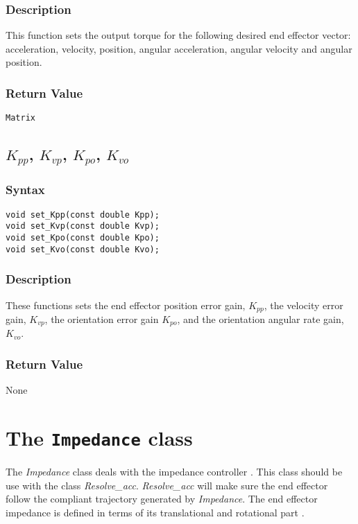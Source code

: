 \documentclass[dvips,11pt,fleqn]{report}
\begin{document}
\subsubsection*{Description}   
This function sets the output torque for the following desired end
effector vector: acceleration, velocity, position, angular
acceleration, angular velocity and angular position.
\subsubsection*{Return Value}

\texttt{Matrix}

\newpage

\subsection*{$K_{pp}$, $K_{vp}$, $K_{po}$, $K_{vo}$}
\subsubsection*{Syntax}
\begin{verbatim}
void set_Kpp(const double Kpp);
void set_Kvp(const double Kvp);
void set_Kpo(const double Kpo);
void set_Kvo(const double Kvo);
\end{verbatim}

\subsubsection*{Description}   
These functions sets the end effector position error gain, $K_{pp}$, the velocity
error gain, $K_{vp}$, the orientation error gain $K_{po}$, and the
orientation angular rate gain, $K_{vo}$.
\subsubsection*{Return Value}

None


\newpage

\section{The \texttt{Impedance} class}

The \emph{Impedance} class deals with the impedance controller
\cite{Caccavale99}. This class should be use with the class
\emph{Resolve\_acc}.  \emph{Resolve\_acc} will make sure the end
effector follow the compliant trajectory generated by
\emph{Impedance}. The end effector impedance is defined in terms of
its translational and rotational part \cite{Caccavale99}.
\end{document}
